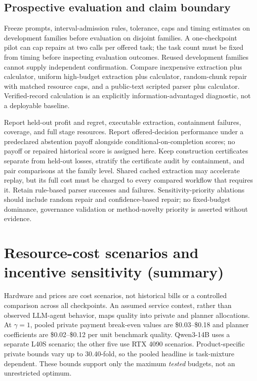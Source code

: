 \documentclass[sigconf,anonymous,nonacm]{acmart}
\begin{document}
\subsection{Prospective evaluation and claim boundary}
Freeze prompts, interval-admission rules, tolerance, caps and timing estimates on development families before evaluation on disjoint families. A one-checkpoint pilot can cap repairs at two calls per offered task; the task count must be fixed from timing before inspecting evaluation outcomes. Reused development families cannot supply independent confirmation. Compare inexpensive extraction plus calculator, uniform high-budget extraction plus calculator, random-chunk repair with matched resource caps, and a public-text scripted parser plus calculator. Verified-record calculation is an explicitly information-advantaged diagnostic, not a deployable baseline.

Report held-out profit and regret, executable extraction, containment failures, coverage, and full stage resources. Report offered-decision performance under a predeclared abstention payoff alongside conditional-on-completion scores; no payoff or repaired historical score is assigned here. Keep construction certificates separate from held-out losses, stratify the certificate audit by containment, and pair comparisons at the family level. Shared cached extraction may accelerate replay, but its full cost must be charged to every compared workflow that requires it. Retain rule-based parser successes and failures. Sensitivity-priority ablations should include random repair and confidence-based repair; no fixed-budget dominance, governance validation or method-novelty priority is asserted without evidence.

\section{Resource-cost scenarios and incentive sensitivity (summary)}\label{sec:costsummary}
Hardware and prices are cost scenarios, not historical bills or a controlled comparison across all checkpoints. An assumed service contest, rather than observed LLM-agent behavior, maps quality into private and planner allocations. At $\gamma=1$, pooled private payment break-even values are \$0.03--\$0.18 and planner coefficients are \$0.02--\$0.12 per unit benchmark quality. Qwen3-14B uses a separate L40S scenario; the other five use RTX 4090 scenarios. Product-specific private bounds vary up to 30.40-fold, so the pooled headline is task-mixture dependent. These bounds support only the maximum \emph{tested} budgets, not an unrestricted optimum.
\end{document}
